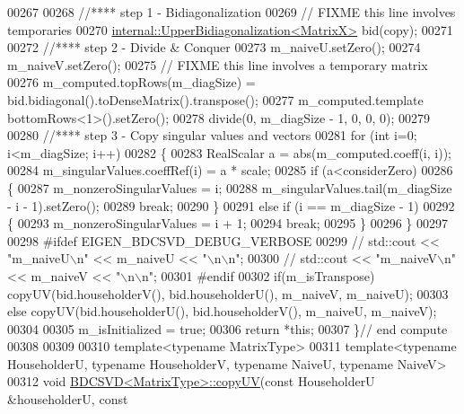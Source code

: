 \begin{DoxyCode}
00267   
00268   \textcolor{comment}{//**** step 1 - Bidiagonalization}
00269   \textcolor{comment}{// FIXME this line involves temporaries}
00270   \hyperlink{class_eigen_1_1internal_1_1_upper_bidiagonalization}{internal::UpperBidiagonalization<MatrixX>} bid(copy);
00271 
00272   \textcolor{comment}{//**** step 2 - Divide & Conquer}
00273   m\_naiveU.setZero();
00274   m\_naiveV.setZero();
00275   \textcolor{comment}{// FIXME this line involves a temporary matrix}
00276   m\_computed.topRows(m\_diagSize) = bid.bidiagonal().toDenseMatrix().transpose();
00277   m\_computed.template bottomRows<1>().setZero();
00278   divide(0, m\_diagSize - 1, 0, 0, 0);
00279 
00280   \textcolor{comment}{//**** step 3 - Copy singular values and vectors}
00281   \textcolor{keywordflow}{for} (\textcolor{keywordtype}{int} i=0; i<m\_diagSize; i++)
00282   \{
00283     RealScalar a = abs(m\_computed.coeff(i, i));
00284     m\_singularValues.coeffRef(i) = a * scale;
00285     \textcolor{keywordflow}{if} (a<considerZero)
00286     \{
00287       m\_nonzeroSingularValues = i;
00288       m\_singularValues.tail(m\_diagSize - i - 1).setZero();
00289       \textcolor{keywordflow}{break};
00290     \}
00291     \textcolor{keywordflow}{else} \textcolor{keywordflow}{if} (i == m\_diagSize - 1)
00292     \{
00293       m\_nonzeroSingularValues = i + 1;
00294       \textcolor{keywordflow}{break};
00295     \}
00296   \}
00297 
00298 \textcolor{preprocessor}{#ifdef EIGEN\_BDCSVD\_DEBUG\_VERBOSE}
00299 \textcolor{comment}{//   std::cout << "m\_naiveU\(\backslash\)n" << m\_naiveU << "\(\backslash\)n\(\backslash\)n";}
00300 \textcolor{comment}{//   std::cout << "m\_naiveV\(\backslash\)n" << m\_naiveV << "\(\backslash\)n\(\backslash\)n";}
00301 \textcolor{preprocessor}{#endif}
00302   \textcolor{keywordflow}{if}(m\_isTranspose) copyUV(bid.householderV(), bid.householderU(), m\_naiveV, m\_naiveU);
00303   \textcolor{keywordflow}{else}              copyUV(bid.householderU(), bid.householderV(), m\_naiveU, m\_naiveV);
00304 
00305   m\_isInitialized = \textcolor{keyword}{true};
00306   \textcolor{keywordflow}{return} *\textcolor{keyword}{this};
00307 \}\textcolor{comment}{// end compute}
00308 
00309 
00310 \textcolor{keyword}{template}<\textcolor{keyword}{typename} MatrixType>
00311 \textcolor{keyword}{template}<\textcolor{keyword}{typename} HouseholderU, \textcolor{keyword}{typename} HouseholderV, \textcolor{keyword}{typename} NaiveU, \textcolor{keyword}{typename} NaiveV>
00312 \textcolor{keywordtype}{void} \hyperlink{group___s_v_d___module_class_eigen_1_1_b_d_c_s_v_d}{BDCSVD<MatrixType>::copyUV}(\textcolor{keyword}{const} HouseholderU &householderU, \textcolor{keyword}{const} 

\end{DoxyCode}
